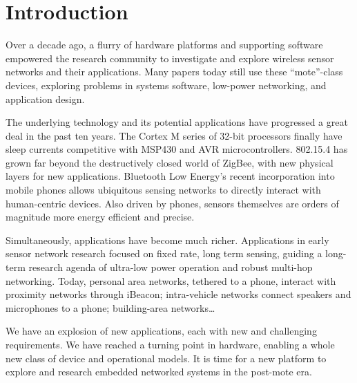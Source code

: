 \section{Introduction}
\label{sec:intro}

Over a decade ago, a flurry of hardware platforms and supporting software
empowered the research community to investigate and explore wireless sensor
networks and their applications. Many papers today still use these
“mote”-class devices, exploring problems in systems software, low-power
networking, and application design. 

The underlying technology and its potential applications have progressed a
great deal in the past ten years. The Cortex M series of 32-bit processors
finally have sleep currents competitive with MSP430 and AVR microcontrollers.
802.15.4 has grown far beyond the destructively closed world of ZigBee, with
new physical layers for new applications. Bluetooth Low Energy’s recent
incorporation into mobile phones allows ubiquitous sensing networks to
directly interact with human-centric devices. Also driven by phones, sensors
themselves are orders of magnitude more energy efficient and precise.

Simultaneously, applications have become much richer. Applications in early
sensor network research focused on fixed rate, long term sensing, guiding a
long-term research agenda of ultra-low power operation and robust multi-hop
networking. Today, personal area networks, tethered to a phone, interact with
proximity networks through iBeacon; intra-vehicle networks connect speakers
and microphones to a phone; building-area networks… 

We have an explosion of new applications, each with new and challenging
requirements. We have reached a turning point in hardware, enabling a whole
new class of device and operational models. It is time for a new platform to
explore and research embedded networked systems in the post-mote era.


\cite{relproj1}

